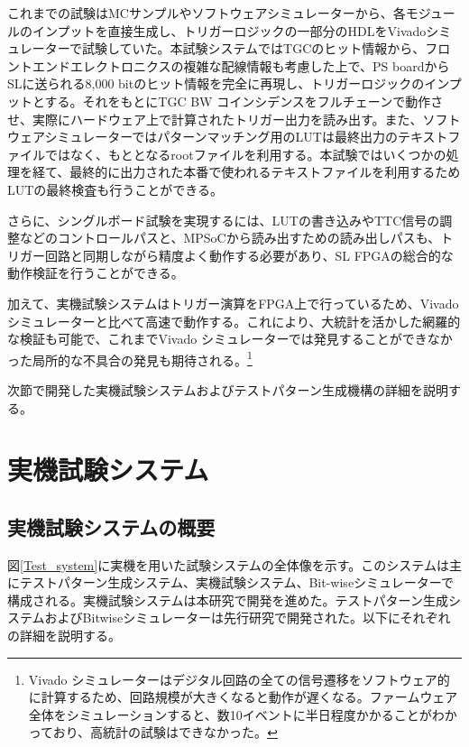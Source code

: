 これまでの試験はMCサンプルやソフトウェアシミュレーターから、各モジュールのインプットを直接生成し、トリガーロジックの一部分のHDLをVivadoシミュレーターで試験していた。本試験システムではTGCのヒット情報から、フロントエンドエレクトロニクスの複雑な配線情報も考慮した上で、PS boardからSLに送られる8,000 bitのヒット情報を完全に再現し、トリガーロジックのインプットとする。それをもとにTGC BW コインシデンスをフルチェーンで動作させ、実際にハードウェア上で計算されたトリガー出力を読み出す。また、ソフトウェアシミュレーターではパターンマッチング用のLUTは最終出力のテキストファイルではなく、もととなるrootファイルを利用する。本試験ではいくつかの処理を経て、最終的に出力された本番で使われるテキストファイルを利用するためLUTの最終検査も行うことができる。

さらに、シングルボード試験を実現するには、LUTの書き込みやTTC信号の調整などのコントロールパスと、MPSoCから読み出すための読み出しパスも、トリガー回路と同期しながら精度よく動作する必要があり、SL FPGAの総合的な動作検証を行うことができる。

加えて、実機試験システムはトリガー演算をFPGA上で行っているため、Vivado シミュレーターと比べて高速で動作する。これにより、大統計を活かした網羅的な検証も可能で、これまでVivado シミュレーターでは発見することができなかった局所的な不具合の発見も期待される。\footnote{Vivado シミュレーターはデジタル回路の全ての信号遷移をソフトウェア的に計算するため、回路規模が大きくなると動作が遅くなる。ファームウェア全体をシミュレーションすると、数10イベントに半日程度かかることがわかっており、高統計の試験はできなかった。}

次節で開発した実機試験システムおよびテストパターン生成機構の詳細を説明する。

\section{実機試験システム}

\subsection*{実機試験システムの概要}
\label{subsec_TestSystemOverview}
図\ref{Test_system}に実機を用いた試験システムの全体像を示す。このシステムは主にテストパターン生成システム、実機試験システム、Bit-wiseシミュレーターで構成される。実機試験システムは本研究で開発を進めた。テストパターン生成システムおよびBitwiseシミュレーターは先行研究で開発された。以下にそれぞれの詳細を説明する。

